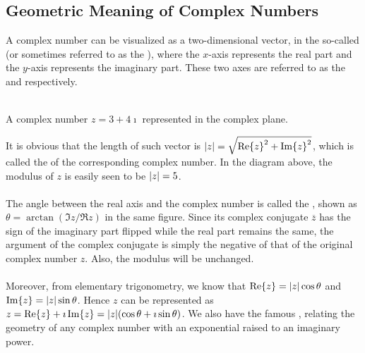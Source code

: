 \subsection{Geometric Meaning of Complex Numbers}
A complex number can be visualized as a two-dimensional vector, in the so-called  (or sometimes referred to as the ), where the $x$-axis represents the real part and the $y$-axis represents the imaginary part. These two axes are referred to as the  and  respectively.
\begin{center}
\\
A complex number $z = 3+4\imath$ represented in the complex plane.
\end{center}
It is obvious that the length of such vector is $\abs{z} = \sqrt{\Re{z}^2 + \Im{z}^2}$, which is called the  of the corresponding complex number. In the diagram above, the modulus of $z$ is easily seen to be $\abs{z} = 5$. \\
\\
The angle between the real axis and the complex number is called the , shown as $\theta = \arctan(\Im{z}/\Re{z})$ in the same figure. Since its complex conjugate $\overline{z}$ has the sign of the imaginary part flipped while the real part remains the same, the argument of the complex conjugate is simply the negative of that of the original complex number $z$. Also, the modulus will be unchanged.\\
\\
Moreover, from elementary trigonometry, we know that $\Re{z} = \abs{z} \cos{\theta}$ and $\Im{z} = \abs{z} \sin{\theta}$. Hence $z$ can be represented as $z = \Re{z} + \imath\Im{z} = \abs{z} (\cos \theta + \imath \sin \theta)$. We also have the famous , relating the geometry of any complex number with an exponential raised to an imaginary power.
